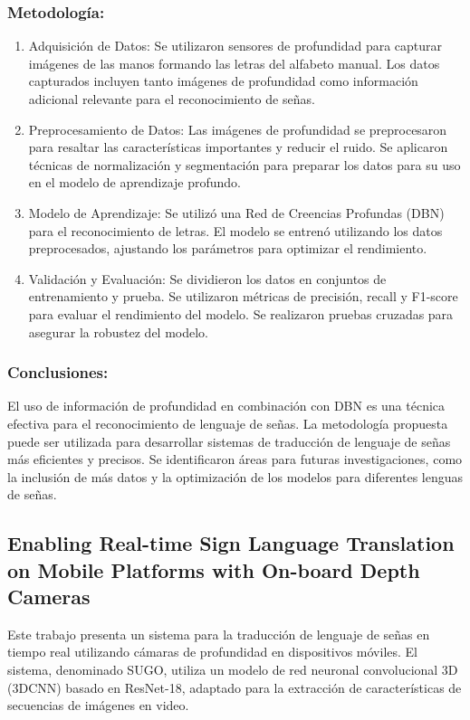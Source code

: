 \subsubsection {Metodología: }
	\begin{enumerate}
		\item {Adquisición de Datos: }
			Se utilizaron sensores de profundidad para capturar imágenes de las manos formando las letras del alfabeto manual. Los datos capturados incluyen tanto imágenes de profundidad como información adicional relevante para el reconocimiento de señas.
		
		\item {Preprocesamiento de Datos: }
			Las imágenes de profundidad se preprocesaron para resaltar las características importantes y reducir el ruido. Se aplicaron técnicas de normalización y segmentación para preparar los datos para su uso en el modelo de aprendizaje profundo.
			
		\item {Modelo de Aprendizaje: }
			Se utilizó una Red de Creencias Profundas (DBN) para el reconocimiento de letras. El modelo se entrenó utilizando los datos preprocesados, ajustando los parámetros para optimizar el rendimiento.
			
		\item {Validación y Evaluación: }
			Se dividieron los datos en conjuntos de entrenamiento y prueba. Se utilizaron métricas de precisión, recall y F1-score para evaluar el rendimiento del modelo. Se realizaron pruebas cruzadas para asegurar la robustez del modelo.
			
\end{enumerate}
\subsubsection {Conclusiones: }
	El uso de información de profundidad en combinación con DBN es una técnica efectiva para el reconocimiento de lenguaje de señas. La metodología propuesta puede ser utilizada para desarrollar sistemas de traducción de lenguaje de señas más eficientes y precisos. Se identificaron áreas para futuras investigaciones, como la inclusión de más datos y la optimización de los modelos para diferentes lenguas de señas.
	

\subsection{Enabling Real-time Sign Language Translation on Mobile Platforms with On-board Depth Cameras}
Este trabajo presenta un sistema para la traducción de lenguaje de señas en tiempo real utilizando cámaras de profundidad en dispositivos móviles. El sistema, denominado SUGO, utiliza un modelo de red neuronal convolucional 3D (3DCNN) basado en ResNet-18, adaptado para la extracción de características de secuencias de imágenes en video.
